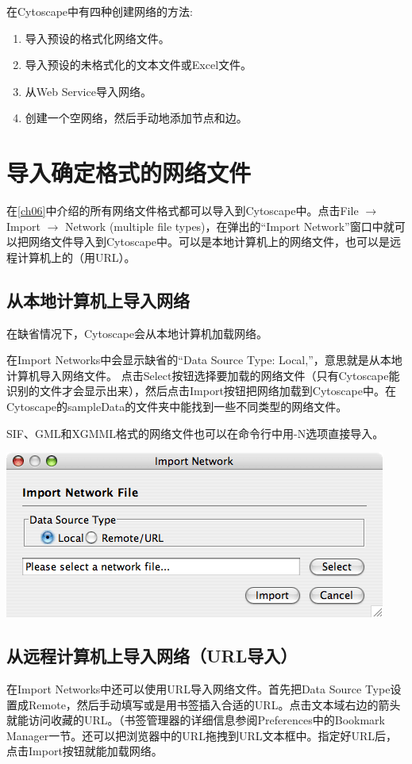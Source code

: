 在Cytoscape中有四种创建网络的方法:
\begin{enumerate}
\item 导入预设的格式化网络文件。
\item 导入预设的未格式化的文本文件或Excel文件。
\item 从Web Service导入网络。
\item 创建一个空网络，然后手动地添加节点和边。
\end{enumerate}
\section{导入确定格式的网络文件}

在\ref{ch06}中介绍的所有网络文件格式都可以导入到Cytoscape中。点击File $\rightarrow$ Import $\rightarrow$ Network (multiple file types)，在弹出的``Import Network''窗口中就可以把网络文件导入到Cytoscape中。可以是本地计算机上的网络文件，也可以是远程计算机上的（用URL）。

 \subsection{从本地计算机上导入网络}
在缺省情况下，Cytoscape会从本地计算机加载网络。

在Import Networks中会显示缺省的``Data Source Type: Local,''，意思就是从本地计算机导入网络文件。 点击Select按钮选择要加载的网络文件（只有Cytoscape能识别的文件才会显示出来），然后点击Import按钮把网络加载到Cytoscape中。在Cytoscape的sampleData的文件夹中能找到一些不同类型的网络文件。 

SIF、GML和XGMML格式的网络文件也可以在命令行中用-N选项直接导入。

\begin{center}
\includegraphics[width=\textwidth]{images/network_import_dialog1_25.png} 
\end{center}

\subsection{从远程计算机上导入网络（URL导入）}
在Import Networks中还可以使用URL导入网络文件。首先把Data Source Type设置成Remote，然后手动填写或是用书签插入合适的URL。点击文本域右边的箭头就能访问收藏的URL。（书签管理器的详细信息参阅Preferences中的Bookmark Manager一节。还可以把浏览器中的URL拖拽到URL文本框中。指定好URL后，点击Import按钮就能加载网络。


